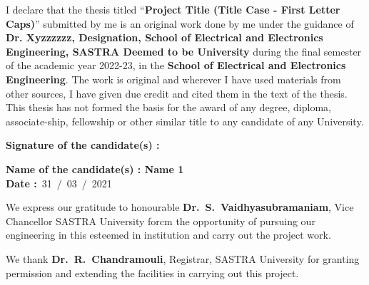 \documentclass[a4paper, 12pt, oneside]{sastra1}
\begin{document}
	\begin{doublespace}
		\linespread{2}
		
		I declare that the thesis titled ``\textbf{Project Title (Title Case - First Letter Caps)}'' submitted by me is an original work done by me under the guidance of \textbf{Dr. Xyzzzzzz, Designation, School of Electrical and Electronics Engineering, SASTRA Deemed to be University} during the final semester of the academic year 2022-23, in the \textbf{School of Electrical and Electronics Engineering}. The work is original and wherever I have used materials from other sources, I have given due credit and cited them in the text of the thesis. This thesis has not formed the basis for the award of any degree, diploma, associate-ship, fellowship or other similar title to any candidate of any University.\\
		
	\end{doublespace}
	
	\noindent\textbf{Signature of the candidate(s)	:}	
	
	\noindent\textbf{Name of the candidate(s)\hspace{7mm}		: Name 1}\\
	
	\noindent\textbf{Date\hspace*{43.5mm}					:}~31~/~03~/~2021\\%
	
		\newpage
	
	\externalcertificate
	
	
	
	
	\acknowledgements
	
	\hspace*{12pt} We express our gratitude to honourable \textbf{Dr.~S.~Vaidhyasubramaniam}, Vice Chancellor SASTRA University forcm the opportunity of pursuing our engineering in this esteemed in institution and carry out the project work.
	
	\par We thank \textbf{Dr.~R.~Chandramouli}, Registrar, SASTRA University for granting permission and extending the facilities in carrying out this project.
	
\end{document}
